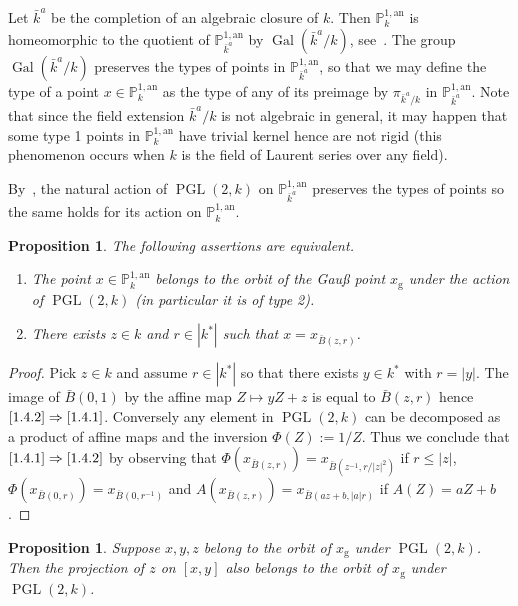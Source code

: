 \documentclass[11pt]{article}
\newtheorem{prop}[theo]{Proposition}
\theoremstyle{definition}
\numberwithin{equation}{section}
\numberwithin{figure}{section}
\numberwithin{table}{section}
\DeclareMathOperator{\Gal}{Gal}
\DeclareMathOperator{\PGL}{PGL}
\newcommand{\an}{\mathrm{an}}
\newcommand{\abs}[1]{\left\vert#1\right\vert}
\newcommand{\PP}{\mathbb{P}}
\begin{document}
Let $\bar{k}^a$ be the completion of an algebraic closure of $k$. Then $\PP^{1,\an}_{k}$ is homeomorphic to the quotient of $\PP^{1,\an}_{\bar{k}^a}$ by $\Gal(\bar{k}^a/k)$, see~\cite[Cor.~1.3.6]{berko}. The group $\Gal(\bar{k}^a/k)$ preserves the types of points in $\PP^{1,\an}_{\bar{k}^a}$, so that we may define the type of a point $x \in \PP^{1,\an}_k$ as the type of any of its preimage by $\pi_{\bar{k}^a/k}$ in $\PP^{1,\an}_{\bar{k}^a}$. Note that since the field extension $\bar{k}^a/k$ is not algebraic in general, it may happen that some type 1 points in $\PP^{1,\an}_k$ have trivial kernel hence are not rigid (this phenomenon occurs when $k$ is the field of Laurent series over any field).

By~\cite[Prop.~2.15]{baker-rumely}, the natural action of $\PGL(2, k)$ on $\PP^{1,\an}_{\bar{k}^a}$ preserves the types of points so the same holds for its action on $\PP^{1,\an}_k$.

\begin{prop}\label{prop:orbit gauss}
The following assertions are equivalent.
\begin{enumerate}
\item \label{1.4.1} The point $x\in \PP^{1,\an}_k$ belongs to the orbit of the Gau{\ss} point $x_{\mathrm{g}}$ under the action of $\PGL(2,k)$ (in particular it is of type 2).
\item \label{1.4.2} There exists $z\in k$ and $r\in |k^*|$ such that $x= x_{\bar{B}(z,r)}$.
\end{enumerate}
\end{prop}

\begin{proof}
Pick $z\in k$ and assume $r\in \abs{k^*}$ so that there exists $y\in k^*$ with $r= |y|$. The image of $\bar{B}(0,1)$ by the affine map $Z \mapsto yZ + z$ is equal to $\bar{B}(z,r)$ hence $\eqref{1.4.2}\Rightarrow\eqref{1.4.1}$. Conversely any element in $\PGL(2,k)$ can be decomposed as a product of affine maps and the inversion $\Phi(Z) := 1/Z$. Thus we conclude that $\eqref{1.4.1}\Rightarrow\eqref{1.4.2}$ by observing that $\Phi(x_{\bar{B}(z,r)})= x_{\bar{B}(z^{-1},r/|z|^2)}$ if $r \le |z|$, $\Phi(x_{\bar{B}(0,r)})= x_{\bar{B}(0,r^{-1})}$ and $A(x_{\bar{B}(z,r)}) = x_{\bar{B}(az+b, |a|r)}$ if $A(Z) = aZ +b$.
\end{proof}

\begin{prop}\label{prop:projection}
Suppose $x,y, z$ belong to the orbit of $x_{\mathrm{g}}$ under $\PGL(2,k)$. Then the projection of $z$ on $[x,y]$ also belongs to the orbit of $x_{\mathrm{g}}$ under $\PGL(2,k)$.
\end{prop}
\end{document}
